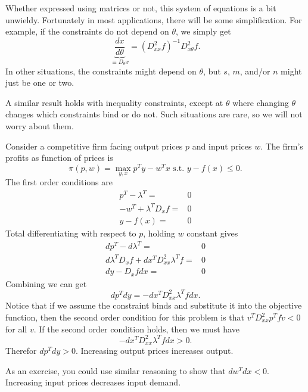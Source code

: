Whether expressed using matrices or not, this system of equations is a
bit unwieldy. Fortunately in most applications, there will be some
simplification. For example, if the constraints do not depend on
$\theta$, we simply get 
\[ \underbrace{\frac{dx}{d\theta}}_{\equiv D_\theta x} = (D^2_{xx}
f)^{-1} D^2_{x\theta} f. \]
In other situations, the constraints might depend on $\theta$, but
$s$, $m$, and/or $n$ might just be one or two. 

A similar result holds with inequality constraints, except at $\theta$
where changing $\theta$ changes which constraints bind or do not. Such
situations are rare, so we will not worry about them.

\begin{example}
  Consider a competitive firm facing output prices $p$ and input
  prices $w$. The firm's profits as function of prices is
  \[ \pi(p,w) = \max_{y,x} p^T y - w^T x \text{ s.t. } y - f(x) \leq
  0. \]
  The first order conditions are
  \begin{align*}
    p^T - \lambda^T = & 0 \\
    -w^T + \lambda^T D_xf = & 0 \\
    y - f(x) = & 0 
  \end{align*}
  Total differentiating with respect to $p$, holding $w$ constant gives
  \begin{align*}
    dp^T - d\lambda^T = & 0 \\
    d\lambda^T D_x f  +  dx^T D^2_{xx}\lambda^T f  = & 0 \\
    dy - D_xf dx = & 0
  \end{align*}
  Combining we can get
  \[ dp^T dy = -dx^T D^2_{xx} \lambda^T f dx. \]
  Notice that if we assume the constraint binds and substitute it into
  the objective function, then the second order condition for this
  problem is that $v^T D^2_{xx} p^T f v < 0$ for all $v$. If the
  second order condition holds, then we must have 
  \[ -dx^T D^2_{xx} \lambda^T f dx > 0. \]
  Therefor $dp^T dy > 0$. Increasing output prices increases output. 
  
  As an exercise, you could use similar reasoning to show that $dw^T
  dx < 0$. Increasing input prices decreases input demand.
\end{example} 

\appendix

